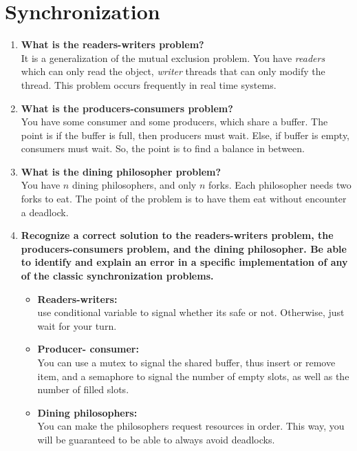 \documentclass[a4paper]{article}
\begin{document}
\section{Synchronization} %
\label{sec:Synchronizatio}
\begin{enumerate}
  \item	{\bf What is the readers-writers problem? } \\
    It is a generalization of the mutual exclusion problem. You have \emph{ readers} which can only read the object, \emph{ writer} threads that can only modify the thread. This problem occurs frequently in real time systems.

  \item {\bf  What is the producers-consumers problem? } \\
    You have some consumer and some producers, which share a buffer. The point is if the buffer is full, then producers must wait. Else, if buffer is empty, consumers must wait. So, the point is to find a balance in between.

  \item {\bf  What is the dining philosopher problem? } \\
   You have $n$ dining philosophers, and only $n$ forks. Each philosopher needs two forks to eat. The point of the problem is to have them eat without encounter a deadlock. 

 \item {\bf  Recognize a correct solution to the readers-writers problem, the producers-consumers problem, and the dining philosopher.  Be able to identify and explain an error in a specific implementation of any of the classic synchronization problems. } \\
    \begin{itemize}
      \item {\bf Readers-writers: } \\
        use conditional variable to signal whether its safe or not. Otherwise, just wait for your turn.
      \item {\bf Producer- consumer:} \\ 
        You can use a mutex to signal the shared buffer, thus insert or remove item, and a semaphore to signal the number of empty slots, as well as the number of filled slots.
      \item {\bf Dining philosophers:} \\
        You can make the philosophers request resources in order. This way, you will be guaranteed to be able to always avoid deadlocks.
    \end{itemize}


\end{enumerate}
\end{document}
